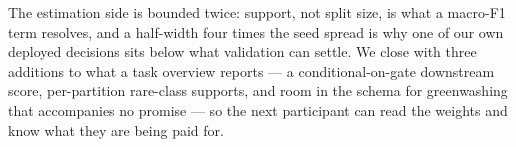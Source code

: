 The estimation side is bounded twice: support, not split size, is what a macro-F1 term resolves,
and a half-width four times the seed spread is why one of our own deployed decisions sits below
what validation can settle. We close with three
additions to what a task overview reports --- a conditional-on-gate downstream score,
per-partition rare-class supports, and room in the schema for greenwashing that accompanies no
promise --- so the next participant can read the weights and know what they are being paid for.
